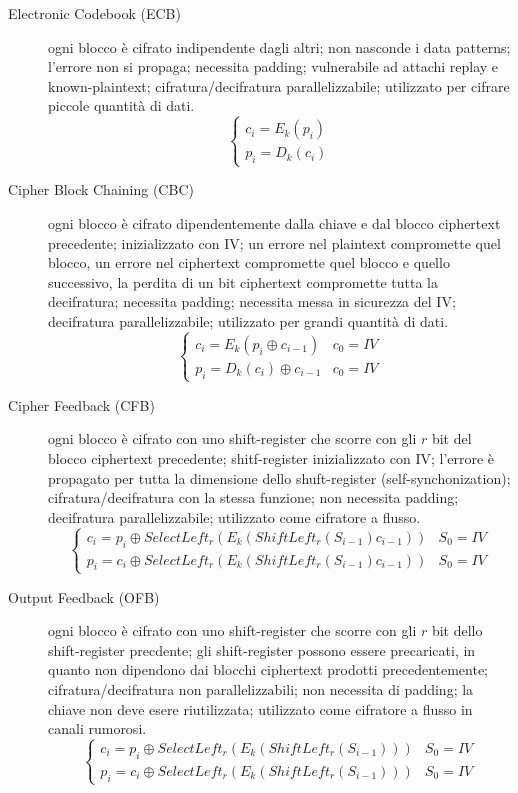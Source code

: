 \begin{description}
  \item[Electronic Codebook (ECB)] ogni blocco è cifrato indipendente dagli altri; non nasconde i data patterns; l'errore non si propaga; necessita padding; vulnerabile ad attachi replay e known-plaintext; cifratura/decifratura parallelizzabile; utilizzato per cifrare piccole quantità di dati.
  $$
  \begin{cases}
    c_{i}=E_{k}(p_{i})\\
    p_{i}=D_{k}(c_{i})
  \end{cases}
  $$

  \item[Cipher Block Chaining (CBC)] ogni blocco è cifrato dipendentemente dalla chiave e dal blocco ciphertext precedente; inizializzato con IV; un errore nel plaintext compromette quel blocco, un errore nel ciphertext compromette quel blocco e quello successivo, la perdita di un bit ciphertext compromette tutta la decifratura; necessita padding; necessita messa in sicurezza del IV; decifratura parallelizzabile; utilizzato per grandi quantità di dati.
  $$
  \begin{cases}
    c_{i}=E_{k}(p_{i} \oplus c_{i-1}) & c_{0}=IV\\
    p_{i}=D_{k}(c_{i}) \oplus c_{i-1} & c_{0}=IV
  \end{cases}
  $$

  \item[Cipher Feedback (CFB)] ogni blocco è cifrato con uno shift-register che scorre con gli $r$ bit del blocco ciphertext precedente; shitf-register inizializzato con IV; l'errore è propagato per tutta la dimensione dello shuft-register (self-synchonization); cifratura/decifratura con la stessa funzione; non necessita padding; decifratura parallelizzabile; utilizzato come cifratore a flusso.
  $$
  \begin{cases}
    c_{i}=p_{i} \oplus SelectLeft_{r}(E_{k}(ShiftLeft_{r}(S_{i-1})c_{i-1})) & S_{0}=IV\\
    p_{i}=c_{i} \oplus SelectLeft_{r}(E_{k}(ShiftLeft_{r}(S_{i-1})c_{i-1})) & S_{0}=IV
  \end{cases}
  $$

  \item[Output Feedback (OFB)] ogni blocco è cifrato con uno shift-register che scorre con gli $r$ bit dello shift-register precdente; gli shift-register possono essere precaricati, in quanto non dipendono dai blocchi ciphertext prodotti precedentemente; cifratura/decifratura non parallelizzabili; non necessita di padding; la chiave non deve esere riutilizzata; utilizzato come cifratore a flusso in canali rumorosi.
  $$
  \begin{cases}
    c_{i}=p_{i} \oplus SelectLeft_{r}(E_{k}(ShiftLeft_{r}(S_{i-1}))) & S_{0}=IV\\
    p_{i}=c_{i} \oplus SelectLeft_{r}(E_{k}(ShiftLeft_{r}(S_{i-1}))) & S_{0}=IV
  \end{cases}
  $$


\end{description}
